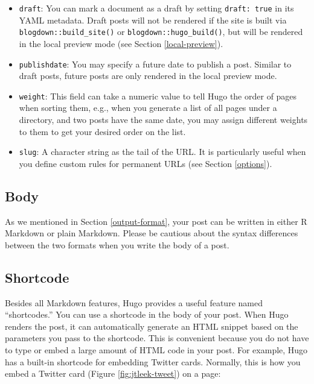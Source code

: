 \documentclass[12pt,]{krantz}
\theoremstyle{definition}
\theoremstyle{definition}
\theoremstyle{definition}
\theoremstyle{remark}
\begin{document}
\begin{itemize}
\item
  \texttt{draft}: You can mark a document as a draft by
  setting \texttt{draft:\ true} in its YAML metadata. Draft posts will
  not be rendered if the site is built via
  \texttt{blogdown::build\_site()} or \texttt{blogdown::hugo\_build()},
  but will be rendered in the local preview mode (see Section
  \ref{local-preview}).
\item
  \texttt{publishdate}: You may specify a future
  date to publish a post. Similar to draft posts,
  future posts are only rendered in the local preview mode.
\item
  \texttt{weight}: This field can take a numeric value to tell Hugo the
  order of pages when sorting them, e.g., when you
  generate a list of all pages under a directory, and two posts have the
  same date, you may assign different weights to them to get your
  desired order on the list.
\item
  \texttt{slug}: A character string as the tail of the URL. It is
  particularly useful when you define custom rules for permanent URLs
  (see Section \ref{options}).
\end{itemize}

\hypertarget{body}{%
\subsection{Body}\label{body}}

As we mentioned in Section \ref{output-format}, your post can be written
in either R Markdown or plain Markdown. Please be cautious about the
syntax differences between the two formats when you write the body of a
post.

\hypertarget{shortcode}{%
\subsection{Shortcode}\label{shortcode}}

Besides all Markdown features, Hugo provides a useful feature named
``shortcodes.'' You can use a shortcode in the body of
your post. When Hugo renders the post, it can automatically generate an
HTML snippet based on the parameters you pass to the shortcode. This is
convenient because you do not have to type or embed a large amount of
HTML code in your post. For example, Hugo has a built-in shortcode for
embedding Twitter cards. Normally, this is how you embed a Twitter card
(Figure \ref{fig:jtleek-tweet}) on a page:
\end{document}
